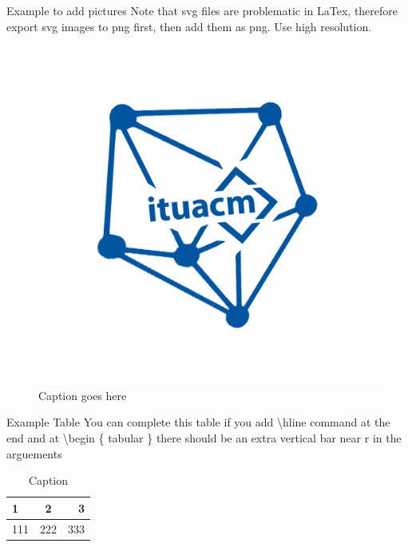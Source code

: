 \documentclass[aspectratio=169]{beamer}%
\begin{document}
\begin{frame}{Example to add pictures}
    Note that svg files are problematic in LaTex, therefore export svg images to png first, then add them as png. Use high resolution.
    \begin{figure}[!ht]%
        \centering%
        \includegraphics[width=.3\textwidth]{acm_algo_logo.png}%
        \caption{Caption goes here}%
    \end{figure}%
\end{frame}%

\begin{frame}{Example Table}%
    You can complete this table if you add \textbackslash hline command at the end and at \textbackslash begin \{ tabular \} there should be an extra vertical bar near r in the arguements
    \begin{table}[ht]%
        \centering%
        \begin{tabular}{|l|c|r}%
            \hline %
            1 & 2 & 3 \\ %
            \hline %
            111 & 222 & 333 
        \end{tabular}%
        \caption{Caption}%
        \label{tab:my_label}%
    \end{table}%
\end{frame}%
\end{document}
